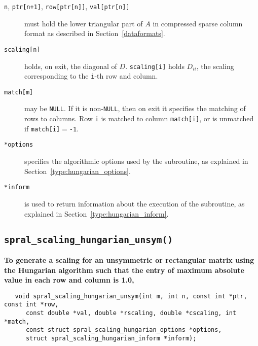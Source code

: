 \begin{description}

\item[\texttt{n}, \texttt{ptr[n+1]}, \texttt{row[ptr[n]]}, \texttt{val[ptr[n]]}] must hold the lower triangular part of $A$ in compressed sparse column format as described in Section~\ref{dataformats}.

\item[\texttt{scaling[n]}] holds, on exit, the diagonal of $D$.
\texttt{scaling[i]} holds $D_{ii}$, the scaling corresponding to the
\texttt{i}-th row and column.

\item[\texttt{match[m]}] may be \texttt{NULL}. If it is non-\texttt{NULL},
then on exit it specifies the matching of rows to columns.
Row \texttt{i} is matched to column \texttt{match[i]}, or is unmatched
if \texttt{match[i]}$=$\texttt{-1}.

\item[\texttt{*options}] specifies the algorithmic options used by the subroutine, as explained in Section~\ref{type:hungarian_options}.

\item[\texttt{*inform}] is used to return information about the execution of the subroutine, as explained in Section~\ref{type:hungarian_inform}.


\end{description}

\subsection{\texttt{spral\_scaling\_hungarian\_unsym()}}

\textbf{\noindent
   To generate a scaling for an unsymmetric or rectangular matrix using the Hungarian algorithm such that the entry of maximum absolute value in each row and column is 1.0,
}
\vspace*{-0.1cm}
\begin{verbatim}
   void spral_scaling_hungarian_unsym(int m, int n, const int *ptr, const int *row,
      const double *val, double *rscaling, double *cscaling, int *match,
      const struct spral_scaling_hungarian_options *options,
      struct spral_scaling_hungarian_inform *inform);
\end{verbatim}

